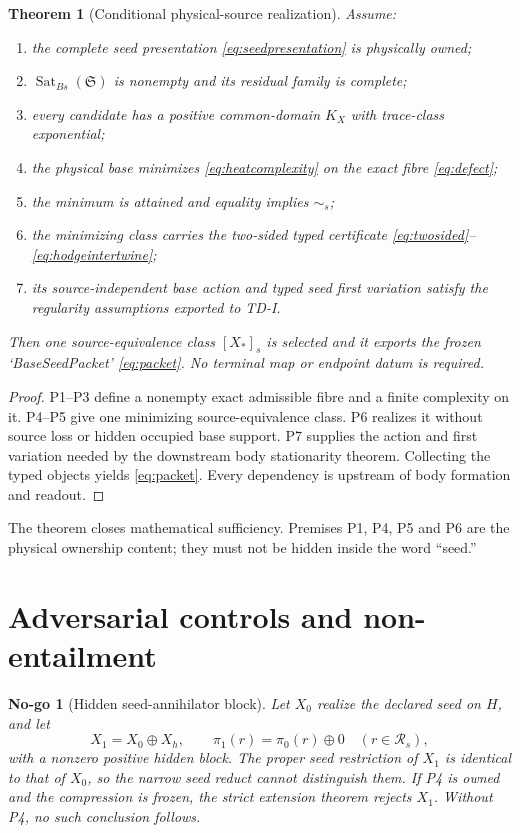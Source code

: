 \documentclass[11pt,a4paper]{article}
\newtheorem{theorem}[definition]{Theorem}
\newtheorem{nogo}[definition]{No-go}
\theoremstyle{remark}
\newcommand{\Sat}{\operatorname{Sat}_{Bs}}
\begin{document}
\begin{theorem}[Conditional physical-source realization]
Assume:
\begin{enumerate}
 \item[(P1)] the complete seed presentation \eqref{eq:seedpresentation} is
 physically owned;
 \item[(P2)] $\Sat(\mathfrak S)$ is nonempty and its residual family is
 complete;
 \item[(P3)] every candidate has a positive common-domain $K_X$ with
 trace-class exponential;
 \item[(P4)] the physical base minimizes \eqref{eq:heatcomplexity} on the
 exact fibre \eqref{eq:defect};
 \item[(P5)] the minimum is attained and equality implies $\sim_s$;
 \item[(P6)] the minimizing class carries the two-sided typed certificate
 \eqref{eq:twosided}--\eqref{eq:hodgeintertwine};
 \item[(P7)] its source-independent base action and typed seed first variation
 satisfy the regularity assumptions exported to TD-I.
\end{enumerate}
Then one source-equivalence class $[X_*]_s$ is selected and it exports the
frozen `BaseSeedPacket' \eqref{eq:packet}.  No terminal map or endpoint datum is
required.
\end{theorem}

\begin{proof}
P1--P3 define a nonempty exact admissible fibre and a finite complexity on it.
P4--P5 give one minimizing source-equivalence class.  P6 realizes it without
source loss or hidden occupied base support.  P7 supplies the action and first
variation needed by the downstream body stationarity theorem.  Collecting the
typed objects yields \eqref{eq:packet}.  Every dependency is upstream of body
formation and readout.
\end{proof}

The theorem closes mathematical sufficiency.  Premises P1, P4, P5 and P6 are
the physical ownership content; they must not be hidden inside the word
``seed.''

\section{Adversarial controls and non-entailment}

\begin{nogo}[Hidden seed-annihilator block]
Let $X_0$ realize the declared seed on $H$, and let
\begin{equation}
 X_1=X_0\oplus X_h,
 \qquad \pi_1(r)=\pi_0(r)\oplus0
 \quad(r\in\mathcal R_s),
 \label{eq:hidden}
\end{equation}
with a nonzero positive hidden block.  The proper seed restriction of $X_1$ is
identical to that of $X_0$, so the narrow seed reduct cannot distinguish them.
If P4 is owned and the compression is frozen, the strict extension theorem
rejects $X_1$.  Without P4, no such conclusion follows.
\end{nogo}
\end{document}
